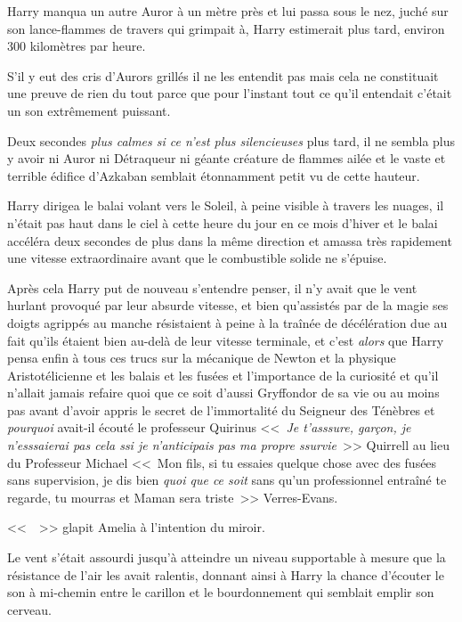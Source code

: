 Harry manqua un autre Auror à un mètre près et lui passa sous le nez, juché sur son lance-flammes de travers qui grimpait à, Harry estimerait plus tard, environ 300 kilomètres par heure.

S'il y eut des cris d'Aurors grillés il ne les entendit pas mais cela ne constituait une preuve de rien du tout parce que pour l'instant tout ce qu'il entendait c'était un son extrêmement puissant.

Deux secondes \emph{plus calmes si ce n'est plus silencieuses} plus tard, il ne sembla plus y avoir ni Auror ni Détraqueur ni géante créature de flammes ailée et le vaste et terrible édifice d'Azkaban semblait étonnamment petit vu de cette hauteur.

Harry dirigea le balai volant vers le Soleil, à peine visible à travers les nuages, il n'était pas haut dans le ciel à cette heure du jour en ce mois d'hiver et le balai accéléra deux secondes de plus dans la même direction et amassa très rapidement une vitesse extraordinaire avant que le combustible solide ne s'épuise.

Après cela Harry put de nouveau s'entendre penser, il n'y avait que le vent hurlant provoqué par leur absurde vitesse, et bien qu'assistés par de la magie ses doigts agrippés au manche résistaient à peine à la traînée de décélération due au fait qu'ils étaient bien au-delà de leur vitesse terminale, et c'est \emph{alors} que Harry pensa enfin à tous ces trucs sur la mécanique de Newton et la physique Aristotélicienne et les balais et les fusées et l'importance de la curiosité et qu'il n'allait jamais refaire quoi que ce soit d'aussi Gryffondor de sa vie ou au moins pas avant d'avoir appris le secret de l'immortalité du Seigneur des Ténèbres et \emph{pourquoi} avait-il écouté le professeur Quirinus <<~\emph{Je t'asssure, garçon, je n'esssaierai pas cela ssi je n'anticipais pas ma propre ssurvie}~>> Quirrell au lieu du Professeur Michael <<~Mon fils, si tu essaies quelque chose avec des fusées sans supervision, je dis bien \emph{quoi que ce soit} sans qu'un professionnel entraîné te regarde, tu mourras et Maman sera triste~>> Verres-Evans.

\later

<<~~>> glapit Amelia à l'intention du miroir.

\later

Le vent s'était assourdi jusqu'à atteindre un niveau supportable à mesure que la résistance de l'air les avait ralentis, donnant ainsi à Harry la chance d'écouter le son à mi-chemin entre le carillon et le bourdonnement qui semblait emplir son cerveau.

